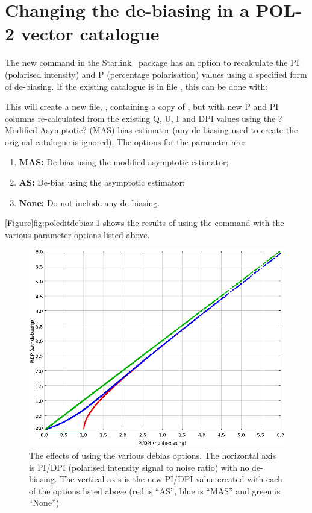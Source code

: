 \section{Changing the de-biasing in a POL-2 vector catalogue}

The new  command in the Starlink \POLPACK\ package has an option to recalculate the PI (polarised intensity) and P (percentage polarisation) values using a specified form of de-biasing. If the existing catalogue is in file , this can be done with:

\begin{terminalv}
\end{terminalv}

This will create a new file, , containing a copy of , but with new P and PI columns re-calculated from the existing Q, U, I and DPI values using the ?Modified Asymptotic? (MAS) bias estimator (any de-biasing used to create the original catalogue is ignored). The options for the  parameter are:

\begin{enumerate}
\item {\bf MAS:} De-bias using the modified asymptotic estimator;
\item {\bf AS:} De-bias using the asymptotic estimator;
\item {\bf None:} Do not include any de-biasing.
\end{enumerate}

\cref{Figure}{fig:poleditdebias-1}{} shows the results of using the  command with the various   parameter options listed above.

\begin{figure}[ht!]
\begin{center}
\includegraphics[width=0.46\linewidth]{sc22-poledit-debias.png}
\caption [The effects of using the various  debias options]{
  The effects of using the various  debias options. The horizontal axis is PI/DPI (polarised intensity signal to noise ratio) with no de-biasing. The vertical axis is the new PI/DPI value created with each of the  options listed above (red is ``AS'', blue is ``MAS'' and green is ``None'')
\label{fig:poleditdebias-1}
}
\end{center}
\end{figure}
